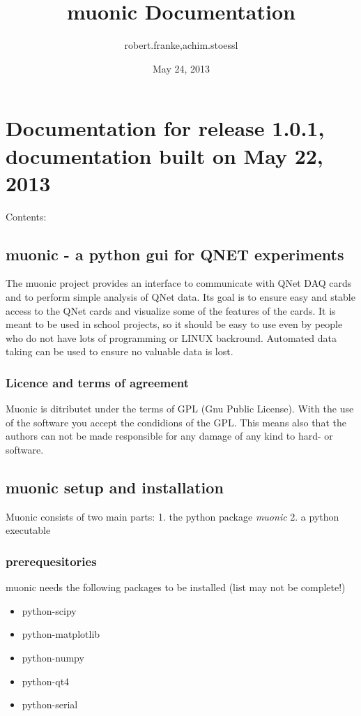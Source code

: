 \documentclass[letterpaper,10pt,english]{sphinxmanual}
\title{muonic Documentation}
\date{May 24, 2013}
\author{robert.franke,achim.stoessl}
\begin{document}
\maketitle
\tableofcontents
{}\label{index::doc}



\chapter{Documentation for release 1.0.1, documentation built on May 22, 2013}
\label{index:welcome-to-muonic-documentation}\label{index:documentation-for-release-release-documentation-built-on-today}
Contents:


\section{muonic - a python gui for QNET experiments}
\label{intro::doc}\label{intro:muonic-a-python-gui-for-qnet-experiments}
The muonic project provides an interface to communicate with QNet DAQ cards and to perform simple analysis of QNet data.
Its goal is to ensure easy and stable access to the QNet cards and visualize some of the features of the cards. It is meant to be used in school projects, so it should be easy to use even by people who do not have lots of programming or LINUX backround. Automated data taking can be used to ensure no valuable data is lost.


\subsection{Licence and terms of agreement}
\label{intro:licence-and-terms-of-agreement}
Muonic is ditributet under the terms of GPL (Gnu Public License). With the use of the software you accept the condidions of the GPL. This means also that the authors can not be made responsible for any damage of any kind to hard- or software.


\section{muonic setup and installation}
\label{setup::doc}\label{setup:muonic-setup-and-installation}
Muonic consists of two main parts:
1. the python package \emph{muonic}
2. a python executable


\subsection{prerequesitories}
\label{setup:prerequesitories}
muonic needs the following packages to be installed (list may not be complete!)
\begin{itemize}
\item {} 
python-scipy

\item {} 
python-matplotlib

\item {} 
python-numpy

\item {} 
python-qt4

\item {} 
python-serial

\end{itemize}
\end{document}
